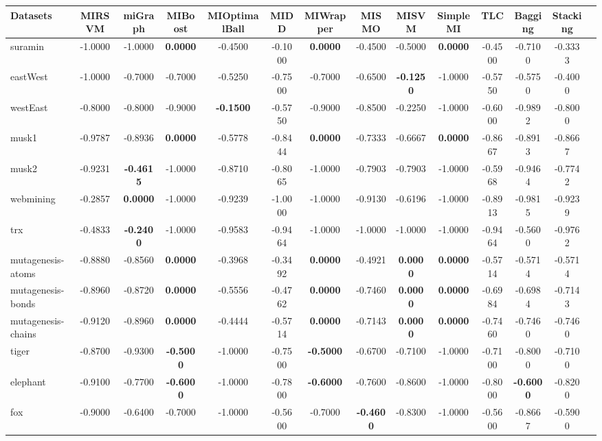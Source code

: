 \begin{threeparttable}
\begin{tabular}{lccccccccccccc}
\toprule
Datasets &MIRSVM &miGraph &MIBoost &MIOptimalBall &MIDD &MIWrapper &MISMO &MISVM &SimpleMI &TLC &Bagging &Stacking \\
\midrule
suramin &-1.0000 &-1.0000 &\textbf{0.0000} &-0.4500 &-0.1000 &\textbf{0.0000} &-0.4500 &-0.5000 &\textbf{0.0000} &-0.4500 &-0.7100 &-0.3333 &  \\
eastWest &-1.0000 &-0.7000 &-0.7000 &-0.5250 &-0.7500 &-0.7000 &-0.6500 &\textbf{-0.1250} &-1.0000 &-0.5750 &-0.5750 &-0.4000 &  \\
westEast &-0.8000 &-0.8000 &-0.9000 &\textbf{-0.1500} &-0.5750 &-0.9000 &-0.8500 &-0.2250 &-1.0000 &-0.6000 &-0.9892 &-0.8000 &  \\
musk1 &-0.9787 &-0.8936 &\textbf{0.0000} &-0.5778 &-0.8444 &\textbf{0.0000} &-0.7333 &-0.6667 &\textbf{0.0000} &-0.8667 &-0.8913 &-0.8667 &  \\
musk2 &-0.9231 &\textbf{-0.4615} &-1.0000 &-0.8710 &-0.8065 &-1.0000 &-0.7903 &-0.7903 &-1.0000 &-0.5968 &-0.9464 &-0.7742 &  \\
webmining &-0.2857 &\textbf{0.0000} &-1.0000 &-0.9239 &-1.0000 &-1.0000 &-0.9130 &-0.6196 &-1.0000 &-0.8913 &-0.9815 &-0.9239 &  \\
trx &-0.4833 &\textbf{-0.2400} &-1.0000 &-0.9583 &-0.9464 &-1.0000 &-1.0000 &-1.0000 &-1.0000 &-0.9464 &-0.5600 &-0.9762 &  \\
mutagenesis-atoms &-0.8880 &-0.8560 &\textbf{0.0000} &-0.3968 &-0.3492 &\textbf{0.0000} &-0.4921 &\textbf{0.0000} &\textbf{0.0000} &-0.5714 &-0.5714 &-0.5714 &  \\
mutagenesis-bonds &-0.8960 &-0.8720 &\textbf{0.0000} &-0.5556 &-0.4762 &\textbf{0.0000} &-0.7460 &\textbf{0.0000} &\textbf{0.0000} &-0.6984 &-0.6984 &-0.7143 &  \\
mutagenesis-chains &-0.9120 &-0.8960 &\textbf{0.0000} &-0.4444 &-0.5714 &\textbf{0.0000} &-0.7143 &\textbf{0.0000} &\textbf{0.0000} &-0.7460 &-0.7460 &-0.7460 &  \\
tiger &-0.8700 &-0.9300 &\textbf{-0.5000} &-1.0000 &-0.7500 &\textbf{-0.5000} &-0.6700 &-0.7100 &-1.0000 &-0.7100 &-0.8000 &-0.7100 &  \\
elephant &-0.9100 &-0.7700 &\textbf{-0.6000} &-1.0000 &-0.7800 &\textbf{-0.6000} &-0.7600 &-0.8600 &-1.0000 &-0.8000 &\textbf{-0.6000} &-0.8200 &  \\
fox &-0.9000 &-0.6400 &-0.7000 &-1.0000 &-0.5600 &-0.7000 &\textbf{-0.4600} &-0.8300 &-1.0000 &-0.5600 &-0.8667 &-0.5900 &  \\

\end{tabular}
\end{threeparttable}
